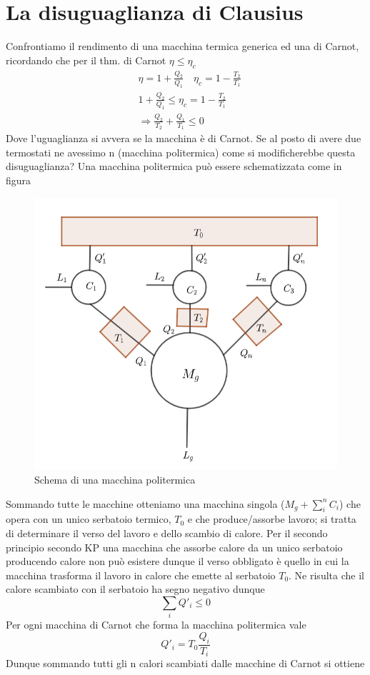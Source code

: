 \documentclass[10pt,a4paper]{article}
\begin{document}
\section{La disuguaglianza di Clausius}
Confrontiamo il rendimento di una macchina termica generica ed una di Carnot, ricordando che per il thm. di Carnot \(\eta \leq \eta_c\)
\begin{align*}
	&\eta = 1 + \frac{Q_2}{Q_1} \quad \eta_c = 1 - \frac{T_2}{T_1}\\
	&1 + \frac{Q_2}{Q_1} \leq \eta_c = 1 - \frac{T_2}{T_1}\\
	&\Rightarrow \frac{Q_2}{T_2}+\frac{Q_1}{T_1}\leq 0
\end{align*}
Dove l'uguaglianza si avvera se la macchina è di Carnot. Se al posto di avere due termostati ne avessimo n (macchina politermica) come si modificherebbe questa disuguaglianza? Una macchina politermica può essere schematizzata come in figura
\begin{figure}[h!]
	\centering
	\includegraphics[width=0.6\linewidth]{../images/macchina_polit}
	\caption{Schema di una macchina politermica}
	\label{fig:macchinapolit}
\end{figure}
\FloatBarrier
Sommando  tutte le macchine otteniamo una macchina singola (\(M_g+\sum_i^n C_i\)) che opera con un unico serbatoio termico, \(T_0\) e che produce/assorbe lavoro; si tratta di determinare il verso del lavoro e dello scambio di calore. Per il secondo principio secondo KP una macchina che assorbe calore da un unico serbatoio producendo calore non può esistere dunque il verso obbligato è quello in cui la macchina trasforma il lavoro in calore che emette al serbatoio \(T_0\). Ne risulta che il calore scambiato con il serbatoio ha segno negativo dunque 
\[\sum_i Q'_i \leq 0\]
Per ogni macchina di Carnot che forma la macchina politermica vale 
\[Q'_i = T_0 \frac{Q_i}{T_i}\]
Dunque sommando tutti gli n calori scambiati dalle macchine di Carnot si ottiene
\end{document}
